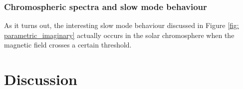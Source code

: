 \subsubsection{Chromospheric spectra and slow mode behaviour}
As it turns out, the interesting slow mode behaviour discussed in Figure \ref{fig: parametric_imaginary} actually occurs in the solar chromosphere when the magnetic field crosses a certain threshold.

\section{Discussion}



\cleardoublepage
